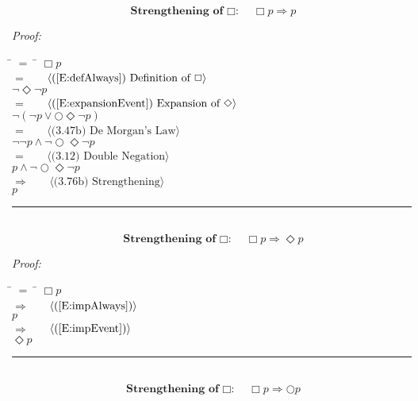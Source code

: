 \documentclass[fleqn, leqno]{article}
\newcommand{\lgap}{2pt}                             %
\newcommand{\mymathindent}{24pt}                    %
\newcommand{\Next}{\bigcirc}
\newcommand{\Event}{\Diamond}
\newcommand{\Always}{\Box}
\newcommand{\myqed}{\hfill\rule[-.23ex]{1.2ex}{2.0ex}}
\newcommand{\Gll} {\langle}                         %
\newcommand{\Ggg} {\rangle}                         %
\newcommand{\Hint}[1]     {\ \ \ $\Gll              \mbox{#1} \Ggg$ }   %
\begin{document}
\begin{equation}\label{E:impAlways}
\textbf{Strengthening of $\Always$:}\quad \Always p \Rightarrow p
\end{equation}

\emph{Proof:}
\begin{tabbing}
\hspace{\mymathindent} \= $= \;$ \= \kill
  \> \>   $\Always p$\\[\lgap]
  \> $=$  \>  \Hint{(\ref{E:defAlways}) Definition of $\Always$}\\[\lgap]
  \> \>   $\lnot\Event\lnot p$\\[\lgap]
  \> $=$  \>  \Hint{(\ref{E:expansionEvent}) Expansion of $\Event$}\\[\lgap]
  \> \>   $\lnot(\lnot p \lor \Next\Event\lnot p)$\\[\lgap]
  \> $=$  \>  \Hint{(3.47b) De Morgan's Law}\\[\lgap]
  \> \>   $\lnot\lnot p \land \lnot\Next\Event\lnot p$\\[\lgap]
  \> $=$  \>  \Hint{(3.12) Double Negation}\\[\lgap]
  \> \>   $p \land \lnot\Next\Event\lnot p$\\[\lgap]
  \> $\Rightarrow$  \>  \Hint{(3.76b) Strengthening}\\[\lgap]
  \> \>   $p$\\[\lgap]
\end{tabbing}
\myqed\\[\lgap]


\begin{equation}\label{E:impAlwaysE}
\textbf{Strengthening of $\Always$:}\quad \Always p \Rightarrow \Event p
\end{equation}

\emph{Proof:}
\begin{tabbing}
\hspace{\mymathindent} \= $= \;$ \= \kill
  \> \>   $\Always p$\\[\lgap]
  \> $\Rightarrow$  \>  \Hint{(\ref{E:impAlways})}\\[\lgap]
  \> \>   $p$\\[\lgap]
  \> $\Rightarrow$  \>  \Hint{(\ref{E:impEvent})}\\[\lgap]
  \> \>   $\Event p$\\[\lgap]
\end{tabbing}
\myqed\\[\lgap]


\begin{equation}\label{E:impAlwaysN}
\textbf{Strengthening of $\Always$:}\quad \Always p \Rightarrow \Next p
\end{equation}
\end{document}
